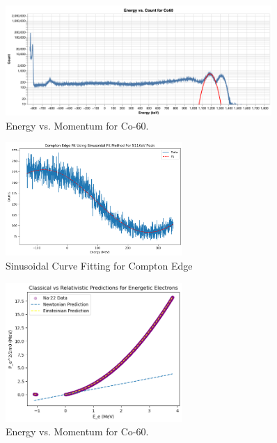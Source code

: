 \documentclass[12pt]{article}
\begin{document}
        \begin{figure}[h!]
                \centering
                \includegraphics[width=0.9\textwidth]{./img/plots/Co60.png}
                \caption{Energy vs. Momentum for Co-60.}
        \end{figure}

        \begin{figure}[h!]
                \centering
                \includegraphics[width=0.6\textwidth]{./img/plots/Graph3.png}
                \caption{Sinusoidal Curve Fitting for Compton Edge}
        \end{figure}
        
        \begin{figure}[h!]
                \centering
                \includegraphics[width=0.6\textwidth]{./img/plots/Graph1.png}
                \caption{Energy vs. Momentum for Co-60.}
        \end{figure}
                        
\end{document}
